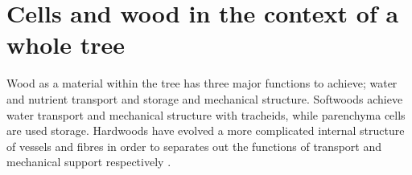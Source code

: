 \section{Cells and wood in the context of a whole tree}
Wood as a material within the tree has three major functions to achieve; water
and nutrient transport and storage and mechanical structure. Softwoods
achieve water transport and mechanical structure with tracheids, while
parenchyma cells are used storage. Hardwoods have evolved a more
complicated internal structure of vessels and fibres in order to separates out
the functions of transport and mechanical support respectively \cite{walker1993primary}.